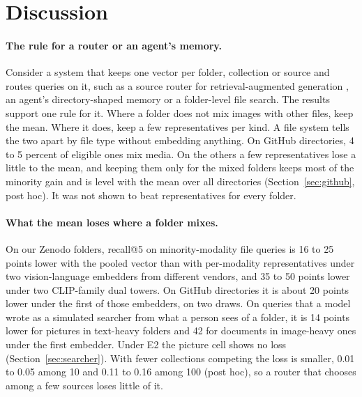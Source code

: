 \documentclass[11pt]{article}
\begin{document}
\section{Discussion}
\label{sec:discussion}

\paragraph{The rule for a router or an agent's memory.} Consider a system that keeps one vector per folder, collection or source and routes queries on it, such as a source router for retrieval-augmented generation \citep{dhasade2026ragroute}, an agent's directory-shaped memory or a folder-level file search. The results support one rule for it. Where a folder does not mix images with other files, keep the mean. Where it does, keep a few representatives per kind. A file system tells the two apart by file type without embedding anything. On GitHub directories, 4 to 5 percent of eligible ones mix media. On the others a few representatives lose a little to the mean, and keeping them only for the mixed folders keeps most of the minority gain and is level with the mean over all directories (Section~\ref{sec:github}, post hoc). It was not shown to beat representatives for every folder.

\paragraph{What the mean loses where a folder mixes.} On our Zenodo folders, recall@5 on minority-modality file queries is 16 to 25 points lower with the pooled vector than with per-modality representatives under two vision-language embedders from different vendors, and 35 to 50 points lower under two CLIP-family dual towers. On GitHub directories it is about 20 points lower under the first of those embedders, on two draws. On queries that a model wrote as a simulated searcher from what a person sees of a folder, it is 14 points lower for pictures in text-heavy folders and 42 for documents in image-heavy ones under the first embedder. Under E2 the picture cell shows no loss (Section~\ref{sec:searcher}). With fewer collections competing the loss is smaller, 0.01 to 0.05 among 10 and 0.11 to 0.16 among 100 (post hoc), so a router that chooses among a few sources loses little of it.
\end{document}
